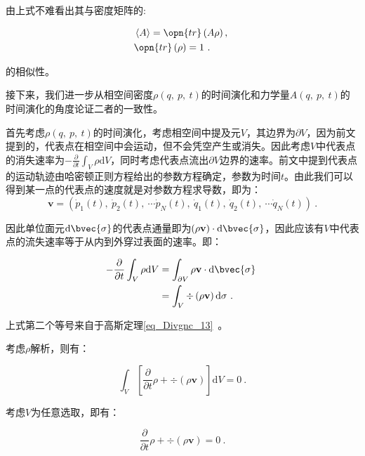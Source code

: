 由上式不难看出其与密度矩阵的:

\begin{equation}
\begin{aligned}
&\left\langle A \right\rangle = \opn{tr}\left(A\rho\right), \\
& \opn{tr}\left(\rho\right)=1~.
\end{aligned}~
\end{equation}

的相似性。

接下来，我们进一步从相空间密度$\rho\left(q,~p,~t\right)$的时间演化和力学量$ A\left(q,~p,~t\right)$的时间演化的角度论证二者的一致性。

首先考虑$\rho\left(q,~p,~t\right)$的时间演化，考虑相空间中提及元$V$，其边界为$\partial V$，因为前文提到的，代表点在相空间中会运动，但不会凭空产生或消失。因此考虑$V$中代表点的消失速率为$-\frac{\partial}{\partial t}\int_V \rho \mathrm{d}V$，同时考虑代表点流出$\partial V$边界的速率。前文中提到代表点的运动轨迹由哈密顿正则方程给出的参数方程确定，参数为时间$t$。由此我们可以得到某一点的代表点的速度就是对参数方程求导数，即为：$$\mathbf{v} = \left(\dot{p}_1(t),~\dot{p}_2(t),~\cdots \dot{p}_N(t),~\dot{q}_1(t),~\dot{q}_2(t),~\cdots \dot{q}_N(t)\right)~.$$

因此单位面元$\mathrm{d}\bvec{\sigma}$的代表点通量即为$\left(\rho\mathbf{v}\right)\cdot \mathrm{d}\bvec{\sigma}$，因此应该有$V$中代表点的流失速率等于从内到外穿过表面的速率。即：

\begin{equation}
\begin{aligned}
-\frac{\partial}{\partial t}\int_V \rho \mathrm{d}V &= \int_{\partial V}\rho\mathbf{v}\cdot \mathrm{d}\bvec{\sigma} \\
&=\int_V\div\left(\rho\mathbf{v}\right)\mathrm{d}\sigma~.
\end{aligned}~
\end{equation}

上式第二个等号来自于高斯定理\autoref{eq_Divgnc_13}~。

考虑$\rho$解析，则有：

$$\int_V \left[\frac{\partial}{\partial t}\rho +\div\left(\rho\mathbf{v}\right)\right]\mathrm{d}V  = 0~.$$

考虑$V$为任意选取，即有：

\begin{equation}\label{eq_denMat_8}
\frac{\partial}{\partial t}\rho +\div\left(\rho\mathbf{v}\right)= 0~.
\end{equation}


